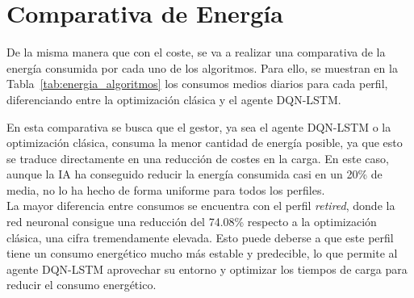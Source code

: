 \section{Comparativa de Energía}
De la misma manera que con el coste, se va a realizar una comparativa de la energía consumida por 
cada uno de los algoritmos. Para ello, se muestran en la Tabla~\ref{tab:energia_algoritmos} los 
consumos medios diarios para cada perfil, diferenciando entre la optimización clásica y el agente 
DQN-LSTM.
\begin{table}[H]
    \centering
    \caption{Comparativa de energía media diaria por perfil entre la optimización clásica y el agente DQN-LSTM, junto con el porcentaje de reducción de consumo energético.}
    \label{tab:energia_algoritmos}
\end{table}

En esta comparativa se busca que el gestor, ya sea el agente DQN-LSTM o la optimización clásica,
consuma la menor cantidad de energía posible, ya que esto se traduce directamente en una reducción 
de costes en la carga. En este caso, aunque la IA ha conseguido reducir la energía consumida casi 
en un 20\% de media, no lo ha hecho de forma uniforme para todos los perfiles.\\

La mayor diferencia entre consumos se encuentra con el perfil \textit{retired}, donde la red 
neuronal consigue una reducción del 74.08\% respecto a la optimización clásica, una cifra 
tremendamente elevada. Esto puede deberse a que este perfil tiene un consumo energético mucho más 
estable y predecible, lo que permite al agente DQN-LSTM aprovechar su entorno y optimizar los tiempos
de carga para reducir el consumo energético.\\

